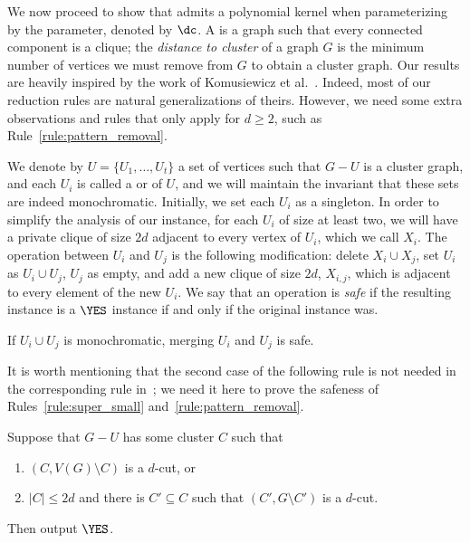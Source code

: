 We now proceed to show that  admits a polynomial kernel when parameterizing by the  parameter, denoted by $\dc$.
A  is a graph such that every connected component is a clique; the \emph{distance to cluster} of a graph $G$ is the minimum number of vertices we must remove from $G$ to obtain a cluster graph.
Our results are heavily inspired by the work of Komusiewicz et al.~\cite{matching_cut_ipec}.
Indeed, most of our reduction rules are natural generalizations of theirs. However, we need some extra observations and rules that only apply for $d \geq 2$, such as Rule~\ref{rule:pattern_removal}.



We denote by $U = \{U_1, \dots, U_t\}$ a set of vertices such that $G - U$ is a cluster graph, and each $U_i$ is called a  or  of $U$, and we will maintain the invariant that these sets are indeed monochromatic. Initially, we set each $U_i$ as a singleton.
In order to simplify the analysis of our instance, for each $U_i$ of size at least two, we will have a private clique of size $2d$ adjacent to every vertex of $U_i$, which we call $X_i$.
The  operation between $U_i$ and $U_j$ is the following modification: delete $X_i \cup X_j$, set $U_i$ as $U_i \cup U_j$, $U_j$ as empty, and add a new clique of size $2d$, $X_{i,j}$, which is adjacent to every element of the new $U_i$.
We say that an operation is \textit{safe} if the resulting instance  is a $\YES$ instance if and only if the original instance was.

\begin{observation}
    If $U_i \cup U_j$ is monochromatic, merging $U_i$ and $U_j$ is safe.
\end{observation}


It is worth mentioning that the second case of the following rule is not needed in the corresponding rule in~\cite{matching_cut_ipec}; we need it here to prove the safeness of Rules~\ref{rule:super_small} and~\ref{rule:pattern_removal}.

\begin{rrule}
    \label{rule:trivial}
    Suppose that $G - U$ has some cluster $C$ such that
    \begin{enumerate}
        \item $(C, V(G) \setminus C)$ is a $d$-cut, or
        \item $|C| \leq 2d$ and there is $C' \subseteq C$ such that $(C', G \setminus C')$ is a $d$-cut.
    \end{enumerate}
    Then output $\YES$.
\end{rrule}

